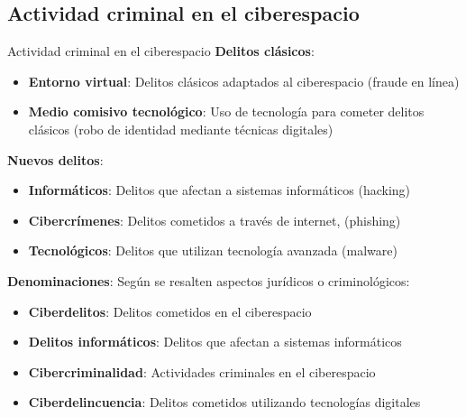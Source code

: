 \documentclass{beamer}
\begin{document}
    \subsection{Actividad criminal en el ciberespacio}
    \begin{frame}{Actividad criminal en el ciberespacio}
        \textbf{Delitos clásicos}:
        \begin{itemize}
            \footnotesize
            \item \textbf{Entorno virtual}: Delitos clásicos adaptados al ciberespacio (fraude en línea)
            \item \textbf{Medio comisivo tecnológico}: Uso de tecnología para cometer delitos clásicos (robo de identidad mediante técnicas digitales)
        \end{itemize}
        \textbf{Nuevos delitos}:
        \begin{itemize}
            \footnotesize
            \item \textbf{Informáticos}: Delitos que afectan a sistemas informáticos (hacking)
            \item \textbf{Cibercrímenes}: Delitos cometidos a través de internet, (phishing)
            \item \textbf{Tecnológicos}: Delitos que utilizan tecnología avanzada (malware)
        \end{itemize}
        \textbf{Denominaciones}: Según se resalten aspectos jurídicos o criminológicos:
        \begin{itemize}
            \footnotesize
            \item \textbf{Ciberdelitos}: Delitos cometidos en el ciberespacio
            \item \textbf{Delitos informáticos}: Delitos que afectan a sistemas informáticos
            \item \textbf{Cibercriminalidad}: Actividades criminales en el ciberespacio
            \item \textbf{Ciberdelincuencia}: Delitos cometidos utilizando tecnologías digitales
        \end{itemize}
    \end{frame}
\end{document}
